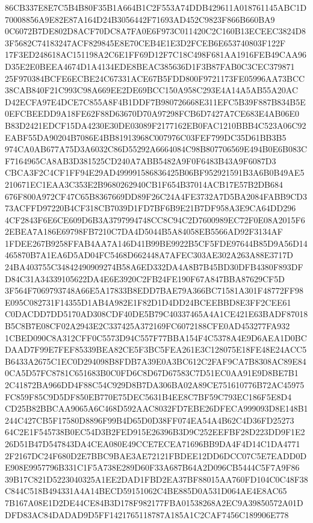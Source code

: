 \documentclass[UTF8,fontset=fandol,zihao=-4,a4paper]{ctexart}
\begin{document}
{{86CB337E8E7C5B4B80F35B1A664B1C2F553A74DDB429611A018761145ABC1D70008856A9E82E87A164D24B3056442F71693AD452C9823F866B660BA9
0C6072B7DE802D8ACF70DC8A7FA0E6F973C011420C2C160B13ECEEC3824D83F5682C74183247ACF829845E8E70CEB4E1E3D2FCEB6E653740803F122F
17F3ED248618AC151198A2C6E1FF69D12F7C18C498F681AA1916FEB49CAA96D35E2E0BEEA4674D1A4134EDE8BEAC385636D1F3B87FAB0C3CEC379871
25F970384BCFE6ECBE24C67331ACE67B5FDD800F9721173FE05996AA73BCC38CAB840F21C993C98A669EE2DE69BCC150A958C293E4A14A5AB55A20AC
D42ECFA97E4DCE7C855A8F4B1DDF7B980726668E311EFC5B39F887B834B5E0EFCBEEDD9A18FE62F88D63670D70A97298FCB6D7427A7CE683E4AB06E0
B83D2421EDCF15DA4230E30DE03089F2177162EB0FAC1210BBB4C523A06C92EABF55DA90204B7086E4BB81913968C007976C03FEF799DC35D61BB3B5
974CA0AB677A75D3A6032C86D55292A6664084C98B807706569E494B0E6B083CF7164965CA8AB3D381525CD240A7ABB5482A9F0F6483B43A9F6087D3
CBCA3F2C4CF1FF94E29AD499991586836425B06BF952921591B3A6B0B49AE5210671EC1EAA3C353E2B9680262940CB1F654B37014ACB17E57B2DB684
676F800A972CF47C65B8367669DD89F26C24A4FE3732A7D5BA2084FABB9CD373ACFFD97220B4CF318CB7039D1FD7BF6B9E21B7DF958A3E9CA64DD296
4CF2843F6E6CE609D6B3A3797994748CC8C94C2D7600989EC72F0E08A2015F62EBEA7A186E69798FB7210C7DA4D5044B5A84058EB5566AD92F3134AF
1FDEE267B9258FFAB4AA7A146D41B99BE9922B5CF5FDE97644B85D9A56D14465870B7A1EA6D5AD04FC5468D662448A7AFEC303AE302A263A88E3717D
24BA403755C34842490909274B58A6ED332DA4A8B7B45BD30DFB4380F893DFD84C31A34339105622DA4E6E3920C2FB24FE190F67A847BBA87629CF5D
3F564F7069793748A66E5A17833B8EDD7BAE79A366BC71581A301F48772FF98E095C082731F14355D1AB4A982E1F82D1D4DD24BCEEBBD8E3FF2CEE61
C0DACDD7DD5170AD308CDF40DE5B79C40337465A4A1CE421E63BADF87018B5C8B7E08CF02A2943E2C337425A372169FC6072188CFE0AD453277FA932
1CBED090C8A312CFF0C5573D94C557F77BBA154F4C5378A4E9D6AEA1D0BCDAAD7F99E7FEF85339BEA82CE5F3BC5FEA261E3C128075E18FE48E24ACC5
B6433A2675C1EC0D294098B8FDB7A39E0A3BC612C2FAF9CA7B8308AC89E840CA5D57FC8781C651683B0C0FD6C8D67D67583C7D51EC0AA91E9D8BE7B1
2C41872BA966DD4F88C54C929D8B7DA306BA02A89CE751610776B72AC45975FC859F85C9D5DF850EB770E75DEC5631B4EE8C7BF59C793EC186F5E8D4
CD25B82BBCAA9065A6C468D592AAC8032FD7EBE26DFECA999093D8E148B1244C427CB5F17580D8896F99B4D65D0D38FF074EA54A4B62C4D36FD25273
64C2E1F545738B0EC54D3B2FED915E26396B3D9C252EEFBF28D223DD9F1E226D51B47D547843DA4CEA080E49CCE7ECEA71696BB9DA4F4D14C1DA4771
2F2167DC24F680D2E7BBC9BAE3AE72121FBDEE12DD6DCC07C5E7EADD0DE908E9957796B331C1F5A738E289D60F33A687B64A2D096CB5444C5F7A9F86
39B17C821D5223040325A1EE2DAD1FBD2EA37BF88015AA760FD104C0C48F38C844C518B494331A4A14BECD59151062C4BE885D0A531D064AE4E8AC65
7B167A08E1D2DE44CE84B3D178F982177FBA01538268A2EC9A39850572A01DDFD83AC84DADAD9D5FF1421765118787A185A1C2CAF7456C189906E778
}}
\end{document}
